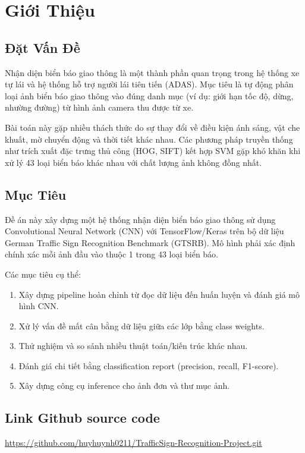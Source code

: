 \documentclass[12pt,a4paper]{article}
\begin{document}
\section{Giới Thiệu}

\subsection{Đặt Vấn Đề}
Nhận diện biển báo giao thông là một thành phần quan trọng trong hệ thống xe tự lái và hệ thống hỗ trợ người lái tiên tiến (ADAS). Mục tiêu là tự động phân loại ảnh biển báo giao thông vào đúng danh mục (ví dụ: giới hạn tốc độ, dừng, nhường đường) từ hình ảnh camera thu được từ xe.

Bài toán này gặp nhiều thách thức do sự thay đổi về điều kiện ánh sáng, vật che khuất, mờ chuyển động và thời tiết khác nhau. Các phương pháp truyền thống như trích xuất đặc trưng thủ công (HOG, SIFT) kết hợp SVM gặp khó khăn khi xử lý 43 loại biển báo khác nhau với chất lượng ảnh không đồng nhất.

\subsection{Mục Tiêu}
Đề án này xây dựng một hệ thống nhận diện biển báo giao thông sử dụng Convolutional Neural Network (CNN) với TensorFlow/Keras trên bộ dữ liệu German Traffic Sign Recognition Benchmark (GTSRB). Mô hình phải xác định chính xác mỗi ảnh đầu vào thuộc 1 trong 43 loại biển báo.

Các mục tiêu cụ thể:
\begin{enumerate}[leftmargin=*]
    \item Xây dựng pipeline hoàn chỉnh từ đọc dữ liệu đến huấn luyện và đánh giá mô hình CNN.
    \item Xử lý vấn đề mất cân bằng dữ liệu giữa các lớp bằng class weights.
    \item Thử nghiệm và so sánh nhiều thuật toán/kiến trúc khác nhau.
    \item Đánh giá chi tiết bằng classification report (precision, recall, F1-score).
    \item Xây dựng công cụ inference cho ảnh đơn và thư mục ảnh.
\end{enumerate}

\subsection{Link Github source code} \url{https://github.com/huyhuynh0211/TrafficSign-Recognition-Project.git}
\end{document}
